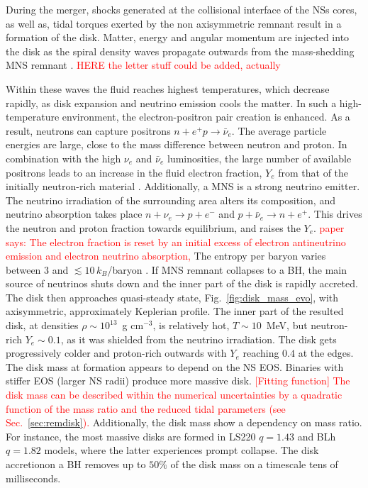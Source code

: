 \documentclass[11pt,a4paper,headinclude=true,DIV=14,BCOR=8mm,chapterprefix,listof=totoc,twoside,openright,abstracton]{scrbook}
\newcommand{\red}[1]{\textcolor{red}{#1}}
\newcommand{\gcm}{g cm$^{-3}$}
\begin{document}
During the merger, shocks generated at the collisional interface of the \acp{NS} cores,
as well as, tidal torques exerted by the non axisymmetric remnant result in a formation
of the disk. 
Matter, energy and angular momentum are injected into the disk as the spiral density waves 
propagate outwards from the mass-shedding \ac{MNS} remnant 
\citep{Bernuzzi:2015opx,Radice:2018xqa}.
\red{HERE the letter stuff could be added, actually}

Within these waves the fluid reaches highest temperatures, which decrease rapidly, as 
disk expansion and neutrino emission cools the matter. 
In such a high-temperature environment, the electron-positron pair creation is enhanced.
As a result, neutrons can capture positrons $n+e^+p\rightarrow\bar{\nu}_e$.
The average particle energies are large, close to the mass difference between neutron 
and proton. 
In combination with the high $\nu_e$ and $\bar{\nu}_e$ luminosities,
the large number of available positrons leads to an increase 
in the fluid electron fraction, $Y_e$ from that of the initially neutron-rich material
\citep{Qian:1996xt}.
Additionally, a \ac{MNS} is a strong neutrino emitter. The neutrino irradiation of the 
surrounding area alters its composition, and neutrino absorption takes place
$n+\nu_e\rightarrow p + e^{-}$ and $p + \bar{\nu}_e\rightarrow n + e^+$.
This drives the neutron and proton fraction towards equilibrium, and raises the $Y_e$.
\red{paper says: 
The electron fraction is reset by an initial excess of electron antineutrino emission
and electron neutrino absorption,}
The entropy per baryon varies between $3$ and $\lesssim 10\,$$k_{B}$/baryon \citep{Perego:2019adq}.
If \ac{MNS} remnant collapses to a BH, the main source of neutrinos shuts down and 
the inner part of the disk is rapidly accreted. 
The disk then approaches quasi-steady state, Fig.~\ref{fig:disk_mass_evo}, with 
axisymmetric, approximately Keplerian profile.
The inner part of the resulted disk, at densities $\rho\sim10^{13}$~\gcm, 
is relatively hot, $T\sim10\,$ MeV, but neutron-rich $Y_e\sim0.1$, as it was shielded 
from the neutrino irradiation. The disk gets progressively colder and proton-rich 
outwards with $Y_e$ reaching $0.4$ at the edges.
The disk mass at formation appears to depend on the \ac{NS} \ac{EOS}. Binaries with 
stiffer EOS (larger \ac{NS} radii) produce more massive disk.
\red{[Fitting function]
    The disk mass can be described within the numerical uncertainties by a
    quadratic function of the mass ratio and the reduced tidal
    parameters (see Sec.~\ref{sec:remdisk}).}
Additionally, the disk mass show a dependency on mass ratio. For instance, the most massive disks are formed in LS220 $q=1.43$ and  BLh $q=1.82$ models, where the latter experiences prompt collapse.
The disk accretionon a \ac{BH} removes up to $50\%$ of the disk mass on a timescale tens of milliseconds.
\end{document}
